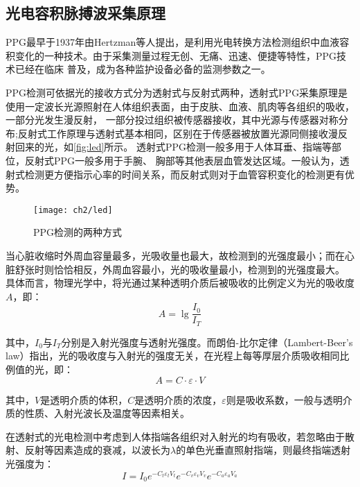 \subsection{光电容积脉搏波采集原理}
PPG最早于1937年由Hertzman等人\cite{Hertzman1937}提出，是利用光电转换方法检测组织中血液容积变化的一种技术。由于采集测量过程无创、无痛、迅速、便捷等特性，PPG技术已经在临床
普及，成为各种监护设备必备的监测参数之一\cite{ldl,lhc}。

PPG检测可依据光的接收方式分为透射式与反射式两种\cite{THOCBPM}，透射式PPG采集原理是使用一定波长光源照射在人体组织表面，由于皮肤、血液、肌肉等各组织的吸收，一部分光发生漫反射，
一部分投过组织被传感器接收，其中光源与传感器对称分布;反射式工作原理与透射式基本相同，区别在于传感器被放置光源同侧接收漫反射回来的光\cite{THOCBPM,mmt}，如\autoref{fig:led}所示。
透射式PPG检测一般多用于人体耳垂、指端等部位，反射式PPG一般多用于手腕、
胸部等其他表层血管发达区域\cite{THOCBPM}。一般认为，透射式检测更方便指示心率的时间关系，而反射式则对于血管容积变化的检测更有优势\cite{mmt}。
\begin{figure}[htbp]
    \centering
    \texttt{[image: ch2/led]}
    \caption{\label{fig:led}PPG检测的两种方式}
\end{figure}

当心脏收缩时外周血容量最多，光吸收量也最大，故检测到的光强度最小；而在心脏舒张时则恰恰相反，外周血容最小，光的吸收量最小，检测到的光强度最大\cite{lhc,cwl}。
具体而言，物理光学中，将光通过某种透明介质后被吸收的比例定义为光的吸收度$A$，即：
\begin{equation}
    \label{equ:LBL}
    A=\lg\frac{I_{0}}{I_{T}}
\end{equation}

其中，$I_{0}$与$I_{T}$分别是入射光强度与透射光强度。而朗伯-比尔定律（Lambert-Beer's law）指出，光的吸收度与入射光的强度无关，在光程上每等厚层介质吸收相同比例值的光，即：
\begin{equation}
    \label{equ:LBL2}
    A=C \cdot \varepsilon \cdot V
\end{equation}

其中，$V$是透明介质的体积，$C$是透明介质的浓度，$\varepsilon$则是吸收系数，一般与透明介质的性质、入射光波长及温度等因素相关。

在透射式的光电检测中考虑到人体指端各组织对入射光的均有吸收，若忽略由于散射、反射等因素造成的衰减，以波长为$\lambda$的单色光垂直照射指端，则最终指端透射光强度为\cite{4122392}：
\begin{equation}
    \label{equ:AF1}
    I=I_{0}e^{-C_{t}\varepsilon _{t}V_{t}}e^{-C_{v}\varepsilon _{v}V_{v}} e^{-C_{a}\varepsilon _{a}V_{a}} 
\end{equation}

